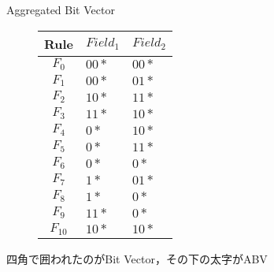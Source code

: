 \documentclass[12pt,dvipdfmx,mathserif,uplatex,aspectratio=32]{beamer}
\begin{document}
\begin{frame}{Aggregated Bit Vector}

\vspace{-10mm}

\begin{figure}[h]
 \def\@captype{table}
 \begin{minipage}[t]{.3\textwidth}
  {\footnotesize
  {\centering
 \begin{tabular}{c|l|l}
  Rule    & $Field_{1}$ & $Field_{2}$ \\ \hline
  $F_{0}$ & $00*$       & $00*$ \\ \hline
  $F_{1}$ & $00*$       & $01*$ \\ \hline
  $F_{2}$ & $10*$       & $11*$ \\ \hline
  $F_{3}$ & $11*$       & $10*$ \\ \hline
  $F_{4}$ & $0*$        & $10*$ \\ \hline
  $F_{5}$ & $0*$        & $11*$ \\ \hline
  $F_{6}$ & $0*$        & $0*$  \\ \hline
  $F_{7}$ & $1*$        & $01*$ \\ \hline
  $F_{8}$ & $1*$        & $0*$  \\ \hline
  $F_{9}$ & $11*$       & $0*$  \\ \hline
  $F_{10}$ & $10*$       & $10*$
 \end{tabular}

  }
  }
  \end{minipage}
  \hfill
  \begin{minipage}[c]{.6\textwidth}
   \vspace{8mm}
   \scalebox{0.45}{}
  \end{minipage}
\end{figure}

{\centering
四角で囲われたのがBit Vector，その下の太字がABV

}

\end{frame}
\end{document}
